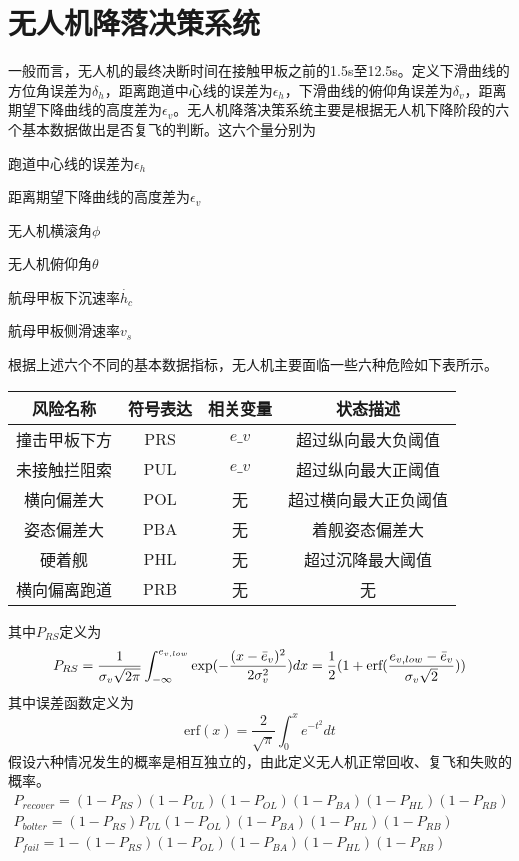 \section{无人机降落决策系统}
一般而言，无人机的最终决断时间在接触甲板之前的1.5s至12.5s。定义下滑曲线的方位角误差为$\delta_h$，距离跑道中心线的误差为$\epsilon_h$，下滑曲线的俯仰角误差为$\delta_v$，距离期望下降曲线的高度差为$\epsilon_v$。无人机降落决策系统主要是根据无人机下降阶段的六个基本数据做出是否复飞的判断。这六个量分别为
\begin{compactenum}
	\item 跑道中心线的误差为$\epsilon_h$
\item 距离期望下降曲线的高度差为$\epsilon_v$
\item 无人机横滚角$\phi$
\item 无人机俯仰角$\theta$
\item 航母甲板下沉速率$\dot{h_c}$
\item 航母甲板侧滑速率$v_s$
\end{compactenum}
根据上述六个不同的基本数据指标，无人机主要面临一些六种危险如下表所示。
\begin{table}
	\centering
	\begin{tabular}{cccc}
		\hline
		风险名称   & 符号表达 & 相关变量 & 状态描述       \\ \hline
		撞击甲板下方 & PRS  & $e\_v$ & 超过纵向最大负阈值  \\
		未接触拦阻索 & PUL  & $e\_v$ & 超过纵向最大正阈值  \\
		横向偏差大  & POL  & 无   & 超过横向最大正负阈值 \\
		姿态偏差大  & PBA  & 无    & 着舰姿态偏差大    \\
		硬着舰    & PHL  & 无   & 超过沉降最大阈值   \\
		横向偏离跑道 & PRB  & 无    & 无          \\
	\end{tabular}
\end{table}
其中$P_{RS}$定义为
\begin{equation}
P_{RS}=\frac{1}{\sigma_v\sqrt{2\pi}}\int_{-\infty}^{e_{v,low}}\exp(-\frac{(x-\bar{e}_v)^2}{2\sigma_v^2})dx \\
=\frac{1}{2}(1+\text{erf}(\frac{e_{v, low}-\bar{e}_v}{\sigma_v\sqrt{2}}))
\end{equation}
其中误差函数定义为
\begin{equation}
\text{erf}(x)=\frac{2}{\sqrt{\pi}}\int_{0}^{x}e^{-t^2}dt
\end{equation}
假设六种情况发生的概率是相互独立的，由此定义无人机正常回收、复飞和失败的概率。
\begin{align}
P_{recover}=(1-P_{RS})(1-P_{UL})(1-P_{OL})(1-P_{BA})(1-P_{HL})(1-P_{RB}) \\
P_{bolter}=(1-P_{RS})P_{UL}(1-P_{OL})(1-P_{BA})(1-P_{HL})(1-P_{RB}) \\
P_{fail}=1-(1-P_{RS})(1-P_{OL})(1-P_{BA})(1-P_{HL})(1-P_{RB})
\end{align}





